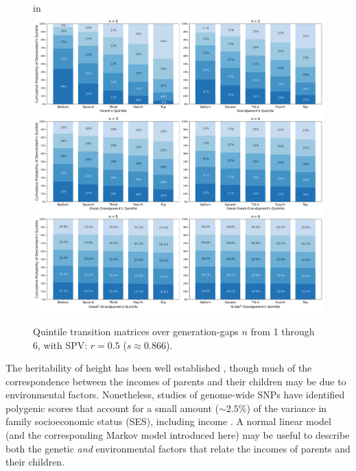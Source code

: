 \documentclass{svproc} %
\begin{document}
\begin{figure}[H]
\centering
\advance{} in
\includegraphics[width=5.2in]{figures/quintile-r=0.5-stable.png} 
\caption{Quintile transition matrices over generation-gaps $n$ from 1 through 6, with SPV: $r = 0.5$ ($s \approx 0.866$).}
\label{fig:quintile_stable}
\end{figure}

The heritability of height has been well established \cite{luo, preece, wood}, though much of the correspondence between the incomes of parents and their children may be due to environmental factors. Nonetheless, studies of genome-wide SNPs have identified polygenic scores that account for a small amount ($\sim 2.5$\%) of the variance in family socioeconomic status (SES), including income \cite{trzaskowski, krapohl}. A normal linear model (and the corresponding Markov model introduced here) may be useful to describe both the genetic \emph{and} environmental factors that relate the incomes of parents and their children.
\end{document}
